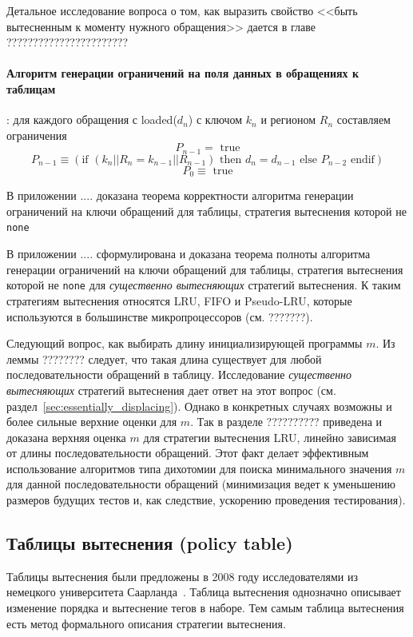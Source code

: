 \documentclass[14pt]{extreport}
\newcommand{\LRU}{\textsf{LRU}\xspace}
\newcommand{\FIFO}{\textsf{FIFO}\xspace}
\newcommand{\PseudoLRU}{\textsf{Pseudo-LRU}\xspace}
\begin{document}
Детальное исследование вопроса о том, как выразить свойство <<быть вытесненным к моменту нужного обращения>> дается в главе ???????????????????????

\paragraph{Алгоритм генерации ограничений на поля данных в обращениях к таблицам}:
для каждого обращения с loaded($d_n$) с ключом $k_n$ и регионом $R_n$ составляем ограничения
$$P_{n-1} = \mbox{~true}$$
$$P_{n-1} \equiv (\mbox{if~} (k_n||R_n = k_{n-1}||R_{n-1}) \mbox{~then~} d_n = d_{n-1} \mbox{~else~} P_{n-2} \mbox{~endif})$$
$$P_0 \equiv \mbox{~true}$$

В приложении .... доказана теорема корректности алгоритма генерации ограничений на ключи обращений для таблицы, стратегия вытеснения которой не \texttt{none}

В приложении .... сформулирована и доказана теорема полноты алгоритма генерации ограничений на ключи обращений для таблицы, стратегия вытеснения которой не \texttt{none} для \emph{существенно вытесняющих} стратегий вытеснения. К таким стратегиям вытеснения относятся \LRU, \FIFO и \PseudoLRU, которые используются в большинстве микропроцессоров (см. ???????).

Следующий вопрос, как выбирать длину инициализирующей программы $m$. Из леммы ???????? следует, что такая длина существует для любой последовательности обращений в таблицу. Исследование \emph{существенно вытесняющих} стратегий вытеснения дает ответ на этот вопрос (см. раздел~\ref{sec:essentially_displacing}). Однако в конкретных случаях возможны и более сильные верхние оценки для $m$. Так в разделе ?????????? приведена и доказана верхняя оценка $m$ для стратегии вытеснения \LRU, линейно зависимая от длины последовательности обращений. Этот факт делает эффективным использование алгоритмов типа дихотомии для поиска минимального значения $m$ для данной последовательности обращений (минимизация ведет к уменьшению размеров будущих тестов и, как следствие, ускорению проведения тестирования).

\subsection{Таблицы вытеснения (policy table)}

Таблицы вытеснения были предложены в 2008 году исследователями из немецкого
университета Саарланда~\cite{policy_tables}. Таблица вытеснения
однозначно описывает изменение порядка и вытеснение тегов в наборе. Тем самым таблица вытеснения есть метод формального описания стратегии вытеснения.
\end{document}
